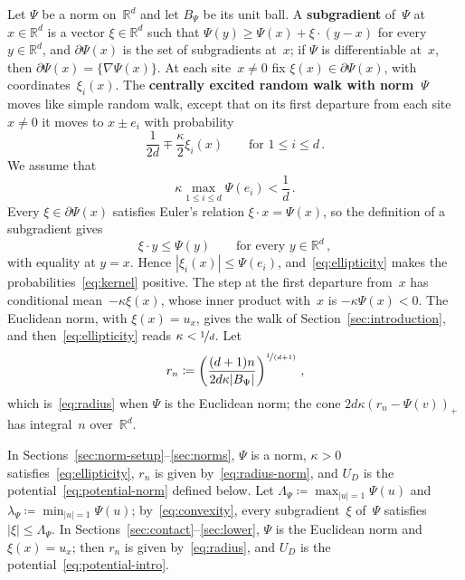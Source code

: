 \documentclass[11pt]{amsart}
\theoremstyle{plain}
\theoremstyle{definition}
\newcommand{\R}{\mathbb R}
\newcommand{\drift}{\kappa}
\newcommand{\gauge}{\Psi}
\newcommand{\defn}[1]{\textbf{#1}}
\newcommand{\nf}{\nicefrac}
\numberwithin{equation}{section}
\begin{document}
Let $\gauge$ be a norm on~$\R^d$ and let $B_\gauge$ be its unit ball. A \defn{subgradient} of~$\gauge$ at~$x\in\R^d$ is a vector $\xi\in\R^d$ such that $\gauge(y)\geq\gauge(x)+\xi\cdot(y-x)$ for every $y\in\R^d$, and $\partial\gauge(x)$ is the set of subgradients at~$x$; if $\gauge$ is differentiable at~$x$, then $\partial\gauge(x)=\{\nabla\gauge(x)\}$. At each site~$x\neq0$ fix $\xi(x)\in\partial\gauge(x)$, with coordinates~$\xi_i(x)$. The \defn{centrally excited random walk with norm~$\gauge$} moves like simple random walk, except that on its first departure from each site~$x\neq0$ it moves to $x\pm e_i$ with probability
\begin{equation}\label{eq:kernel}
\frac1{2d}\mp\frac\drift2\xi_i(x)
\qquad\text{for } 1\leq i\leq d\, .
\end{equation}
We assume that
\begin{equation}\label{eq:ellipticity}
\drift\max_{1\leq i\leq d}\gauge(e_i)<\frac1d\, .
\end{equation}
Every $\xi\in\partial\gauge(x)$ satisfies Euler's relation $\xi\cdot x=\gauge(x)$, so the definition of a subgradient gives
\begin{equation}\label{eq:convexity}
\xi\cdot y\leq\gauge(y)\qquad\text{for every }y\in\R^d\, ,
\end{equation}
with equality at $y=x$. Hence $|\xi_i(x)|\leq\gauge(e_i)$, and~\eqref{eq:ellipticity} makes the probabilities~\eqref{eq:kernel} positive. The step at the first departure from~$x$ has conditional mean~$-\drift\xi(x)$, whose inner product with~$x$ is $-\drift\gauge(x)<0$. The Euclidean norm, with $\xi(x)=u_x$, gives the walk of Section~\ref{sec:introduction}, and then~\eqref{eq:ellipticity} reads $\drift<\nf1d$. Let
\begin{equation}\label{eq:radius-norm}
r_n\coloneqq\left(\frac{(d+1)n}{2d\drift|B_\gauge|}\right)^{\nf{1}{(d+1)}}\, ,
\end{equation}
which is~\eqref{eq:radius} when $\gauge$ is the Euclidean norm; the cone $2d\drift(r_n-\gauge(v))_+$ has integral~$n$ over~$\R^d$.

In Sections~\ref{sec:norm-setup}--\ref{sec:norms}, $\gauge$ is a norm, $\drift>0$ satisfies~\eqref{eq:ellipticity}, $r_n$ is given by~\eqref{eq:radius-norm}, and $U_D$ is the potential~\eqref{eq:potential-norm} defined below. Let $\Lambda_\gauge\coloneqq\max_{|u|=1}\gauge(u)$ and $\lambda_\gauge\coloneqq\min_{|u|=1}\gauge(u)$; by~\eqref{eq:convexity}, every subgradient~$\xi$ of~$\gauge$ satisfies $|\xi|\leq\Lambda_\gauge$. In Sections~\ref{sec:contact}--\ref{sec:lower}, $\gauge$ is the Euclidean norm and $\xi(x)=u_x$; then $r_n$ is given by~\eqref{eq:radius}, and $U_D$ is the potential~\eqref{eq:potential-intro}.
\end{document}
